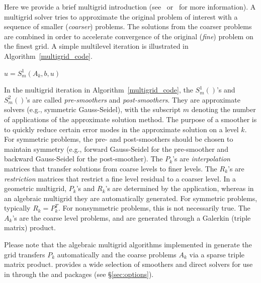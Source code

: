 \label{sec:multigrid intro}
Here we provide a brief multigrid introduction (see~\cite{MGTutorial}
or~\cite{OwlBook} for more information). A multigrid solver tries to approximate
the original problem of interest with a sequence of smaller (\textit{coarser})
problems. The solutions from the coarser problems are combined in order to
accelerate convergence of the original (\textit{fine}) problem on the finest
grid. A simple multilevel iteration is illustrated in
Algorithm~\ref{multigrid_code}.

\begin{algorithm}
\centering
\begin{algorithmic}[0]
    \State $ u = S^{1}_m (A_k, b, u)$
        \State{}
      \EndIf
  \EndFunction
\end{algorithmic}
\caption{V-cycle multigrid with $N$ levels to solve $Ax=b$.}
\label{multigrid_code}
\end{algorithm}

In the multigrid iteration in Algorithm~\ref{multigrid_code}, the $S^{1}_m()$'s
and $S^{2}_m()$'s are called \textit{pre-smoothers} and \textit{post-smoothers}.
They are approximate solvers (e.g., symmetric Gauss-Seidel), with the subscript
$m$ denoting the number of applications of the approximate solution method. The
purpose of a smoother is to quickly reduce certain error modes in the
approximate solution on a level $k$. For symmetric problems, the pre-
and post-smoothers should be chosen to maintain symmetry (e.g., forward
Gauss-Seidel for the pre-smoother and backward Gauss-Seidel for the
post-smoother). The $P_k$'s are \textit{interpolation} matrices that transfer
solutions from coarse levels to finer levels. The $R_k$'s are
\textit{restriction} matrices that restrict a fine level residual to a coarser
level. In a geometric multigrid, $P_k$'s and $R_k$'s are determined
by the application, whereas in an algebraic multigrid they are automatically
generated. For symmetric problems, typically $R_k=P_k^T$. For nonsymmetric
problems, this is not necessarily true. The $A_k$'s are the coarse level
problems, and are generated through a Galerkin (triple matrix) product.

Please note that the algebraic multigrid algorithms implemented in \muelu{}
generate the grid transfers $P_k$ automatically and the coarse problems $A_k$
via a sparse triple matrix product. \trilinos{} provides a wide selection of
smoothers and direct solvers for use in \muelu through the
\ifpacktwo{} and \amesostwo{} packages (see \S\ref{sec:options}).

